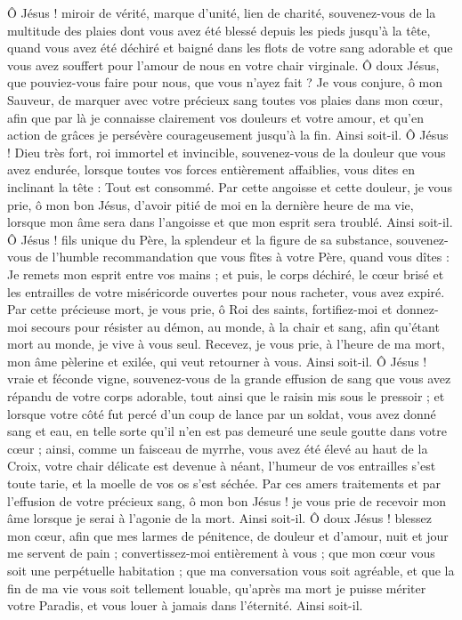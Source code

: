 \priere Ô Jésus ! miroir de vérité, marque d’unité, lien de charité, souvenez-vous de la multitude des plaies dont vous avez été blessé depuis les pieds jusqu’à la tête, quand vous avez été déchiré et baigné dans les flots de votre sang adorable et que vous avez souffert pour l’amour de nous en votre chair virginale. Ô doux Jésus, que pouviez-vous faire pour nous, que vous n’ayez fait ? Je vous conjure, ô mon Sauveur, de marquer avec votre précieux sang toutes vos plaies dans mon cœur, afin que par là je connaisse clairement vos douleurs et votre amour, et qu’en action de grâces je persévère courageusement jusqu’à la fin. Ainsi soit-il.
\priere Ô Jésus ! Dieu très fort, roi immortel et invincible, souvenez-vous de la douleur que vous avez endurée, lorsque toutes vos forces entièrement affaiblies, vous dites en inclinant la tête : Tout est consommé. Par cette angoisse et cette douleur, je vous prie, ô mon bon Jésus, d’avoir pitié de moi en la dernière heure de ma vie, lorsque mon âme sera dans l’angoisse et que mon esprit sera troublé. Ainsi soit-il.
\priere Ô Jésus ! fils unique du Père, la splendeur et la figure de sa substance, souvenez-vous de l’humble recommandation que vous fîtes à votre Père, quand vous dîtes : Je remets mon esprit entre vos mains ; et puis, le corps déchiré, le cœur brisé et les entrailles de votre miséricorde ouvertes pour nous racheter, vous avez expiré. Par cette précieuse mort, je vous prie, ô Roi des saints, fortifiez-moi et donnez-moi secours pour résister au démon, au monde, à la chair et sang, afin qu’étant mort au monde, je vive à vous seul. Recevez, je vous prie, à l’heure de ma mort, mon âme pèlerine et exilée, qui veut retourner à vous. Ainsi soit-il.
\priere Ô Jésus ! vraie et féconde vigne, souvenez-vous de la grande effusion de sang que vous avez répandu de votre corps adorable, tout ainsi que le raisin mis sous le pressoir ; et lorsque votre côté fut percé d’un coup de lance par un soldat, vous avez donné sang et eau, en telle sorte qu’il n’en est pas demeuré une seule goutte dans votre cœur ; ainsi, comme un faisceau de myrrhe, vous avez été élevé au haut de la Croix, votre chair délicate est devenue à néant, l’humeur de vos entrailles s’est toute tarie, et la moelle de vos os s’est séchée. Par ces amers traitements et par l’effusion de votre précieux sang, ô mon bon Jésus ! je vous prie de recevoir mon âme lorsque je serai à l’agonie de la mort. Ainsi soit-il.
\priere Ô doux Jésus ! blessez mon cœur, afin que mes larmes de pénitence, de douleur et d’amour, nuit et jour me servent de pain ; convertissez-moi entièrement à vous ; que mon cœur vous soit une perpétuelle habitation ; que ma conversation vous soit agréable, et que la fin de ma vie vous soit tellement louable, qu’après ma mort je puisse mériter votre Paradis, et vous louer à jamais dans l’éternité. Ainsi soit-il.
\culdelampe